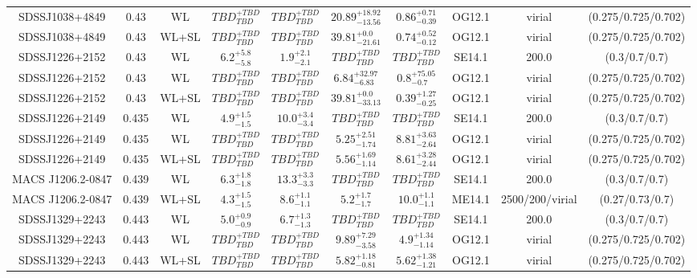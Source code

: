 \begin{table}
\begin{tabular}{cccccccccc}
SDSSJ1038+4849 & 0.43 & WL & ${TBD}^{+TBD}_{TBD}$ & ${TBD}^{+TBD}_{TBD}$ & ${20.89}^{+18.92}_{-13.56}$ & ${0.86}^{+0.71}_{-0.39}$ & OG12.1 & virial & (0.275/0.725/0.702) \\
SDSSJ1038+4849 & 0.43 & WL+SL & ${TBD}^{+TBD}_{TBD}$ & ${TBD}^{+TBD}_{TBD}$ & ${39.81}^{+0.0}_{-21.61}$ & ${0.74}^{+0.52}_{-0.12}$ & OG12.1 & virial & (0.275/0.725/0.702) \\
SDSSJ1226+2152 & 0.43 & WL & ${6.2}^{+5.8}_{-5.8}$ & ${1.9}^{+2.1}_{-2.1}$ & ${TBD}^{+TBD}_{TBD}$ & ${TBD}^{+TBD}_{TBD}$ & SE14.1 & 200.0 & (0.3/0.7/0.7) \\
SDSSJ1226+2152 & 0.43 & WL & ${TBD}^{+TBD}_{TBD}$ & ${TBD}^{+TBD}_{TBD}$ & ${6.84}^{+32.97}_{-6.83}$ & ${0.8}^{+75.05}_{-0.7}$ & OG12.1 & virial & (0.275/0.725/0.702) \\
SDSSJ1226+2152 & 0.43 & WL+SL & ${TBD}^{+TBD}_{TBD}$ & ${TBD}^{+TBD}_{TBD}$ & ${39.81}^{+0.0}_{-33.13}$ & ${0.39}^{+1.27}_{-0.25}$ & OG12.1 & virial & (0.275/0.725/0.702) \\
SDSSJ1226+2149 & 0.435 & WL & ${4.9}^{+1.5}_{-1.5}$ & ${10.0}^{+3.4}_{-3.4}$ & ${TBD}^{+TBD}_{TBD}$ & ${TBD}^{+TBD}_{TBD}$ & SE14.1 & 200.0 & (0.3/0.7/0.7) \\
SDSSJ1226+2149 & 0.435 & WL & ${TBD}^{+TBD}_{TBD}$ & ${TBD}^{+TBD}_{TBD}$ & ${5.25}^{+2.51}_{-1.74}$ & ${8.81}^{+3.63}_{-2.64}$ & OG12.1 & virial & (0.275/0.725/0.702) \\
SDSSJ1226+2149 & 0.435 & WL+SL & ${TBD}^{+TBD}_{TBD}$ & ${TBD}^{+TBD}_{TBD}$ & ${5.56}^{+1.69}_{-1.14}$ & ${8.61}^{+3.28}_{-2.44}$ & OG12.1 & virial & (0.275/0.725/0.702) \\
MACS J1206.2-0847 & 0.439 & WL & ${6.3}^{+1.8}_{-1.8}$ & ${13.3}^{+3.3}_{-3.3}$ & ${TBD}^{+TBD}_{TBD}$ & ${TBD}^{+TBD}_{TBD}$ & SE14.1 & 200.0 & (0.3/0.7/0.7) \\
MACS J1206.2-0847 & 0.439 & WL+SL & ${4.3}^{+1.5}_{-1.5}$ & ${8.6}^{+1.1}_{-1.1}$ & ${5.2}^{+1.7}_{-1.7}$ & ${10.0}^{+1.1}_{-1.1}$ & ME14.1 & 2500/200/virial & (0.27/0.73/0.7) \\
SDSSJ1329+2243 & 0.443 & WL & ${5.0}^{+0.9}_{-0.9}$ & ${6.7}^{+1.3}_{-1.3}$ & ${TBD}^{+TBD}_{TBD}$ & ${TBD}^{+TBD}_{TBD}$ & SE14.1 & 200.0 & (0.3/0.7/0.7) \\
SDSSJ1329+2243 & 0.443 & WL & ${TBD}^{+TBD}_{TBD}$ & ${TBD}^{+TBD}_{TBD}$ & ${9.89}^{+7.29}_{-3.58}$ & ${4.9}^{+1.34}_{-1.14}$ & OG12.1 & virial & (0.275/0.725/0.702) \\
SDSSJ1329+2243 & 0.443 & WL+SL & ${TBD}^{+TBD}_{TBD}$ & ${TBD}^{+TBD}_{TBD}$ & ${5.82}^{+1.18}_{-0.81}$ & ${5.62}^{+1.38}_{-1.21}$ & OG12.1 & virial & (0.275/0.725/0.702) \\

\end{tabular}
\end{table}
